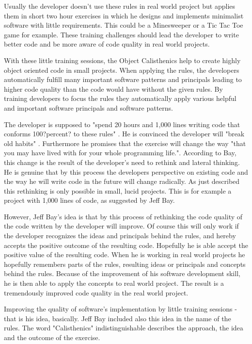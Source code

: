 Usually the developer doesn't use these rules in real world project but applies them in short two hour exercises in which he designs and implements minimalist software with little requirements. This could be a Minesweeper or a Tic Tac Toe game for example. These training challenges should lead the developer to write better code and be more aware of code quality in real world projects.

With these little training sessions, the Object Calisthenics help to create highly object oriented code  in small projects. When applying the rules, the developers automatically fulfill many important software patterns and principals leading to higher code quality than the code would have without the given rules. By training developers to focus the rules they automatically apply various helpful and important software principals and software patterns. 

The developer is supposed to "spend 20 hours and 1,000 lines writing code that conforms 100?percent? to these rules" \cite[p. 80]{oc2008}. He is convinced the developer will "break old habits" \cite[p. 80]{oc2008}. Furthermore he promises that the exercise will change the way "that you may have lived with for your whole programming life."\cite[p. 80]{oc2008}. According to Bay, this change is the result of the developer's need to rethink and lateral thinking. He is genuine that by this process the developers perspective on existing code and the way he will write code in the future will change radically. As just described this rethinking is only possible in small, lucid projects. This is for example a project with 1,000 lines of code, as suggested by Jeff Bay. 

However, Jeff Bay's idea is that by this process of rethinking the code quality of the code written by the developer will improve.
Of course this will only work if the developer recognizes the ideas and principals behind the rules, and hereby accepts the positive outcome of the resulting code. Hopefully he is able accept the positive value of the resulting code. When he is working in real world projects he hopefully remembers parts of the rules, resulting ideas or principals and concepts behind the rules. Because of the improvement of his software development skill, he is then able to apply the concepts to real world project. The result is a tremendously improved code quality in the real world project.

Improving the quality of software's implementation by little training sessions - that is his idea, basically. Jeff Bay included also this idea in the name of the rules. The word "Calisthenics" indistinguishable describes the approach, the idea and the outcome of the exercise.

